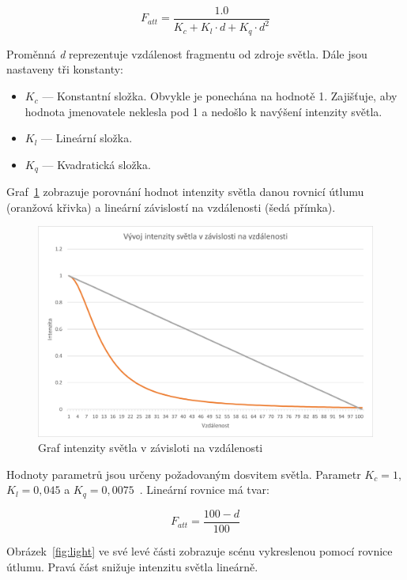 \documentclass[thesis=M,czech]{FITthesis}[2019/12/23]
\begin{document}
$$ F_{att} = \frac{1.0}{K_c + K_l \cdot d + K_q \cdot d^2} $$

Proměnná \textit{d} reprezentuje vzdálenost fragmentu od zdroje světla. Dále jsou nastaveny tři konstanty:

\begin{itemize}
\item $K_c$ --- Konstantní složka. Obvykle je ponechána na hodnotě 1. Zajišťuje, aby hodnota jmenovatele neklesla pod 1 a nedošlo k navýšení intenzity světla.

\item $K_l$ --- Lineární složka. 

\item $K_q$ --- Kvadratická složka.
\end{itemize}

Graf~\ref{fig:lum} zobrazuje porovnání hodnot intenzity světla danou rovnicí útlumu (oranžová křivka) a lineární závislostí na vzdálenosti (šedá přímka).

\begin{figure}\centering
	\includegraphics[width=\textwidth]{images/lum}
	\caption[Graf intenzity světla v závisloti na vzdálenosti]{Graf intenzity světla v závisloti na vzdálenosti}\label{fig:lum}
\end{figure}

Hodnoty parametrů jsou určeny požadovaným dosvitem světla. Parametr $K_c = 1$, $K_l = 0,045$ a $K_q = 0,0075$~\cite{ogre_att}. Lineární rovnice má tvar:

$$ F_{att} = \frac{100 - d}{100} $$

Obrázek~\ref{fig:light} ve své levé části zobrazuje scénu vykreslenou pomocí rovnice útlumu. Pravá část snižuje intenzitu světla lineárně.
\end{document}
